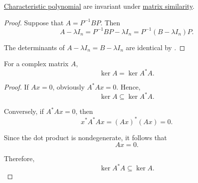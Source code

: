 \begin{proposition}\label{thm:similar_matrices_characteristic_polynomial}
  \hyperref[def:characteristic_polynomial]{Characteristic polynomial} are invariant under \hyperref[def:similar_matrices]{matrix similarity}.
\end{proposition}
\begin{proof}
  Suppose that \( A = P^{-1} B P \). Then
  \begin{equation*}
    A - \lambda I_n = P^{-1} B P - \lambda I_n = P^{-1} (B - \lambda I_n) P.
  \end{equation*}

  The determinants of \( A - \lambda I_n = B - \lambda I_n \) are identical by .
\end{proof}

\begin{lemma}\label{thm:kernel_of_complex_matrix}
  For a complex matrix \( A \),
  \begin{equation*}
    \ker A = \ker A^* A.
  \end{equation*}
\end{lemma}
\begin{proof}
  If \( Ax = 0 \), obviously \( A^* A x = 0 \). Hence,
  \begin{equation*}
    \ker A \subseteq \ker A^* A.
  \end{equation*}

  Conversely, if \( A^* A x = 0 \), then
  \begin{equation*}
    x^* A^* A x = (Ax)^* (Ax) = 0.
  \end{equation*}

  Since the dot product is nondegenerate, it follows that
  \begin{equation*}
    Ax = 0.
  \end{equation*}

  Therefore,
  \begin{equation*}
    \ker A^* A \subseteq \ker A.
  \end{equation*}
\end{proof}

